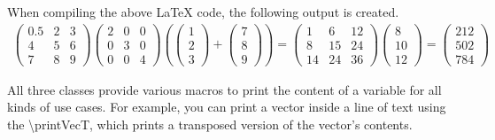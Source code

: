 When compiling the above \LaTeX{} code, the following output is created.
\begin{align*}
    \begin{pmatrix}0.5&2&3\\4&5&6\\7&8&9\end{pmatrix}
    \begin{pmatrix}2&0&0\\0&3&0\\0&0&4\end{pmatrix}
    \left(
        \begin{pmatrix}1\\2\\3\end{pmatrix} +
        \begin{pmatrix}7\\8\\9\end{pmatrix}
    \right)
    = \begin{pmatrix}1&6&12\\8&15&24\\14&24&36\end{pmatrix}
    \begin{pmatrix}8\\10\\12\end{pmatrix}
    = \begin{pmatrix}212\\502\\784\end{pmatrix}
\end{align*}

All three classes provide various macros to print the content of a variable for all kinds of use cases.
For example, you can print a vector inside a line of text using the \textbackslash printVecT, which prints a transposed version of the vector's contents.

\clearpage